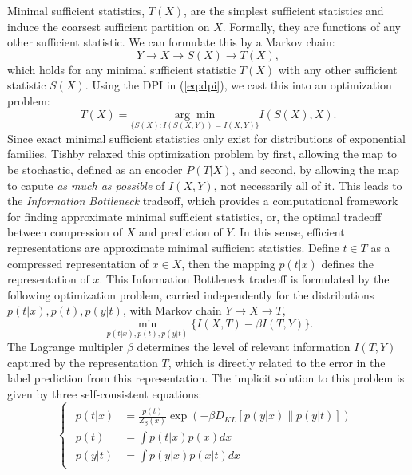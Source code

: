 \documentclass[11pt]{article}
\begin{document}
Minimal sufficient statistics, $T(X)$, are the simplest sufficient statistics and induce the coarsest sufficient partition on $X$. Formally, they are functions of any other sufficient statistic. We can formulate this by a Markov chain:
\begin{equation}
Y\rightarrow X\rightarrow S(X) \rightarrow T(X),
\end{equation}
which holds for any minimal sufficient statistic $T(X)$ with any other sufficient statistic $S(X)$. Using the DPI in (\ref{eq:dpi}), we cast this into an optimization problem:
\begin{equation}
T(X) = \underset{\{S(X):I(S(X,Y))=I(X,Y)\}}{\arg\min} I(S(X), X).
\end{equation}
Since exact minimal sufficient statistics only exist for distributions of exponential families, Tishby relaxed this optimization problem by first, allowing the map to be stochastic, defined as an encoder $P(T\vert X)$, and second, by allowing the map to capute \textit{as much as possible} of $I(X,Y)$, not necessarily all of it.
This leads to the \textit{Information Bottleneck} tradeoff, which provides a computational framework for finding approximate minimal sufficient statistics, or, the optimal tradeoff between compression of $X$ and prediction of $Y$. In this sense, efficient representations are approximate minimal sufficient statistics.
Define $t\in T$ as a compressed representation of $x\in X$, then the mapping $p(t\vert x)$ defines the representation of $x$. This Information Bottleneck tradeoff is formulated by the following optimization problem, carried independently for the distributions $p(t\vert x), p(t), p(y\vert t)$, with Markov chain $Y\rightarrow X \rightarrow T$,
\begin{equation}
\underset{p(t\vert x), p(t), p(y\vert t)}{\min} \{ I(X,T)-\beta I(T,Y) \}.
\end{equation}
The Lagrange multipler $\beta$ determines the level of relevant information $I(T,Y)$ captured by the representation $T$, which is directly related to the error in the label prediction from this representation. The implicit solution to this problem is given by three self-consistent equations:
\begin{equation}
\begin{cases}
\begin{array}{rl}
p(t\vert x) & =\frac{p(t)}{Z_{\beta}(x)}\exp\left(-\beta D_{KL}\left[p(y\vert x)\rVert p(y\vert t)\right]\right)\\
p(t) & =\int p(t\vert x)p(x)dx\\
p(y\vert t) & =\int p(y\vert x)p(x\vert t)dx
\end{array}
\end{cases}
\end{equation}
\end{document}
